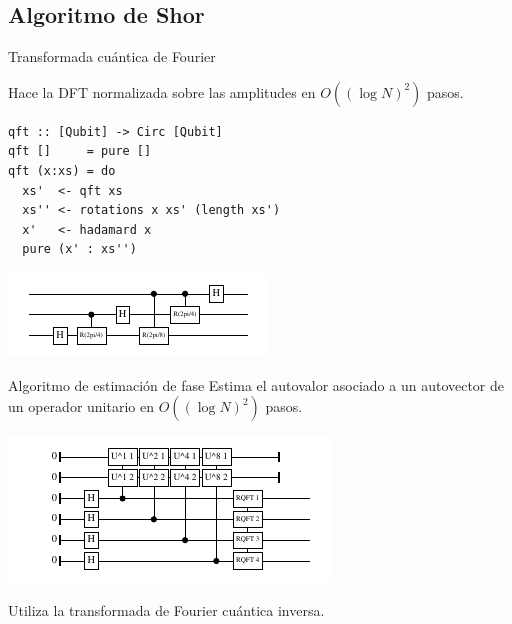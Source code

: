 \documentclass[ignorenonframetext,aspectratio=43,]{beamer}
\begin{document}
\subsection{Algoritmo de Shor}

\begin{frame}[fragile]{Transformada cuántica de Fourier}

  Hace la DFT normalizada sobre las amplitudes en $O((\log N)^2)$ pasos.

\begin{lstlisting}
qft :: [Qubit] -> Circ [Qubit]
qft []     = pure []
qft (x:xs) = do
  xs'  <- qft xs
  xs'' <- rotations x xs' (length xs')
  x'   <- hadamard x
  pure (x' : xs'')
\end{lstlisting}
  \includegraphics[width=\textwidth]{img/qft}
\end{frame}

\begin{frame}{Algoritmo de estimación de fase}
  Estima el autovalor asociado a un autovector de un operador unitario en $O((\log N)^2)$ pasos.

  \includegraphics[width=\textwidth]{img/qpe}

  Utiliza la transformada de Fourier cuántica inversa.
\end{frame}
\end{document}
